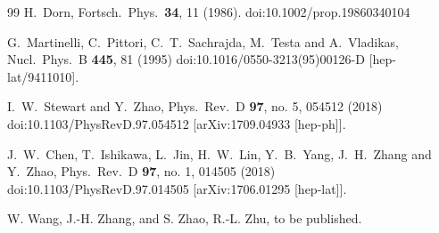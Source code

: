 \begin{thebibliography}{99}
  H.~Dorn,
  Fortsch.\ Phys.\  {\bf 34}, 11 (1986).
  doi:10.1002/prop.19860340104


  G.~Martinelli, C.~Pittori, C.~T.~Sachrajda, M.~Testa and A.~Vladikas,
  Nucl.\ Phys.\ B {\bf 445}, 81 (1995)
  doi:10.1016/0550-3213(95)00126-D
  [hep-lat/9411010].

  I.~W.~Stewart and Y.~Zhao,
  Phys.\ Rev.\ D {\bf 97}, no. 5, 054512 (2018)
  doi:10.1103/PhysRevD.97.054512
  [arXiv:1709.04933 [hep-ph]].


  J.~W.~Chen, T.~Ishikawa, L.~Jin, H.~W.~Lin, Y.~B.~Yang, J.~H.~Zhang and Y.~Zhao,
  Phys.\ Rev.\ D {\bf 97}, no. 1, 014505 (2018)
  doi:10.1103/PhysRevD.97.014505
  [arXiv:1706.01295 [hep-lat]].


W. Wang, J.-H. Zhang, and S. Zhao, R.-L. Zhu, to be published.

\end{thebibliography}
